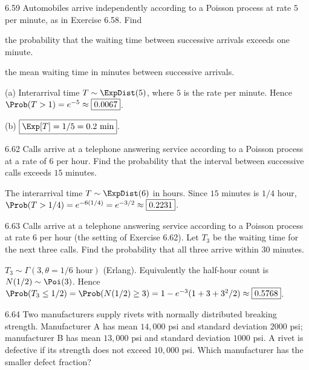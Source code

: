 \documentclass[11pt,oneside]{article}
\begin{document}
\begin{exercise}{6.59}
Automobiles arrive independently according to a Poisson process at rate $5$ per minute, as in Exercise 6.58. Find
\begin{exercisesubparts}
\item the probability that the waiting time between successive arrivals exceeds one minute.
\item the mean waiting time in minutes between successive arrivals.
\end{exercisesubparts}
\end{exercise}

\begin{solution}
\noindent\textup{(a)} Interarrival time $T\sim\ExpDist(5)$, where $5$ is the rate per minute. Hence $\Prob(T>1)=e^{-5}\approx\boxed{0.0067}$.

\noindent\textup{(b)} $\boxed{\Exp[T]=1/5=0.2\text{ min}}$.
\end{solution}

\begin{exercise}{6.62}
Calls arrive at a telephone answering service according to a Poisson process at a rate of $6$ per hour. Find the probability that the interval between successive calls exceeds $15$ minutes.
\end{exercise}

\begin{solution}
The interarrival time $T\sim\ExpDist(6)$ in hours. Since $15$ minutes is $1/4$ hour, $\Prob(T>1/4)=e^{-6(1/4)}=e^{-3/2}\approx\boxed{0.2231}$.
\end{solution}

\begin{exercise}{6.63}
Calls arrive at a telephone answering service according to a Poisson process at rate $6$ per hour (the setting of Exercise 6.62). Let $T_3$ be the waiting time for the next three calls. Find the probability that all three arrive within $30$ minutes.
\end{exercise}

\begin{solution}
$T_3\sim\Gamma(3,\theta=1/6\text{ hour})$ (Erlang). Equivalently the half-hour count is $N(1/2)\sim\Poi(3)$. Hence $\Prob(T_3\le1/2)=\Prob(N(1/2)\ge3)=1-e^{-3}(1+3+3^2/2)\approx\boxed{0.5768}$.
\end{solution}

\begin{exercise}{6.64}
Two manufacturers supply rivets with normally distributed breaking strength. Manufacturer A has mean $14{,}000$ psi and standard deviation $2000$ psi; manufacturer B has mean $13{,}000$ psi and standard deviation $1000$ psi. A rivet is defective if its strength does not exceed $10{,}000$ psi. Which manufacturer has the smaller defect fraction?
\end{exercise}
\end{document}
